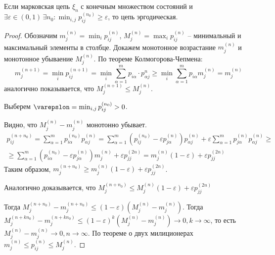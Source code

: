 \begin{theorem}
  Если марковская цепь $\xi_n$ с конечным множеством состояний и $\exists \varepsilon\in(0, 1) \, \exists n_0 : \min_{i, j} p_{ij}^{(n_0)} \geqslant \varepsilon$, то цепь эргодическая.
\end{theorem}
\begin{proof}
  Обозначим $m_j^{(n)} = \min_i p_{ij}^{(n)}$, $M_j^{(n)} = \max_i p_{ij}^{(n)}$ -- минимальный 
  и максимальный элементы в столбце. Докажем монотонное возрастание $m_{j}^{(n)}$ и монотонное
  убываение $M_j^{(n)}$. По теореме Колмогорова-Чепмена:
  \[
    m_{j}^{(n+1)} = \min_i p_{ij}^{(n+1)}
    = \min_i \sum_{\alpha=1}^m p_{i\alpha} \cdot p_{\alpha j}^{n} \geqslant 
    \min_i \sum_{\alpha=1}^m p_{i \alpha} m_j^{(n)}
    = m_j^{(n)}
  \]
  аналогично показывается, что $M_{j}^{(n+1)} \leqslant M_j^{(n)}$.


  Выберем $\varepslon = \min_{i, j} p_{ij}^{(n_0)} > 0$.

  Видно, что $M_j^{(n)}-m_j^{(n)}$ монотонно убывает.
  \begin{multline*}
    p_{ij}^{(n+n_0)} = \sum_{\alpha=1}^m p_{i\alpha}^{(n_0)} p_{\alpha j}^{(n)}
    = \sum_{\alpha=1}^m (p_{ij}^{(n_0)} - \varepsilon p_{j \alpha}^{(n)}) p_{\alpha j}^{(n)}
      + \varepsilon \sum_{\alpha=1}^m p_{j \alpha}^{(n)} p_{\alpha j}^{(n)} \geqslant \\
    \geqslant \sum_{\alpha=1}^m (p_{i\alpha}^{(n_0)} - \varepsilon p_{j\alpha}^{(n)}) m_j^{(n)}
      + \varepsilon p_{jj}^{(2n)}
    = m_j^{(n)} (1-\varepsilon) + \varepsilon p_{jj}^{(2n)}
  \end{multline*}
  Таким образом, $m_j^{(n+n_0)} \geqslant m_j^{(n)} (1-\varepsilon) + \varepsilon p_{jj}^{(2n)}$.
  
  Аналогично доказывается, что $M_j^{(n+n_0)} \leqslant M_j^{(n)} (1-\varepsilon) + \varepsilon p_{jj}^{(2n)}$
  
  Тогда $M_{j}^{(n+n_0)} - m_j^{(n+n_0)} \leqslant (1-\varepsilon) (M_j^{(n)} - m_j^{(n)})$. 
  Тогда $M_j^{(n+kn_0)} - m_j^{(n+kn_0)} \leqslant (1-\varepsilon)^k (M_j^{(n)} - m_j^{(n)}) \to 0, k\to \infty$, то есть $M_{j}^{(n)} - m_j^{(n)} \to 0, n \to \infty$. По теореме о двух милиционерах
  $m_j^{(n)} \leqslant p_{ij}^{(n)} \leqslant M_j^{(n)}$.
  
\end{proof}


